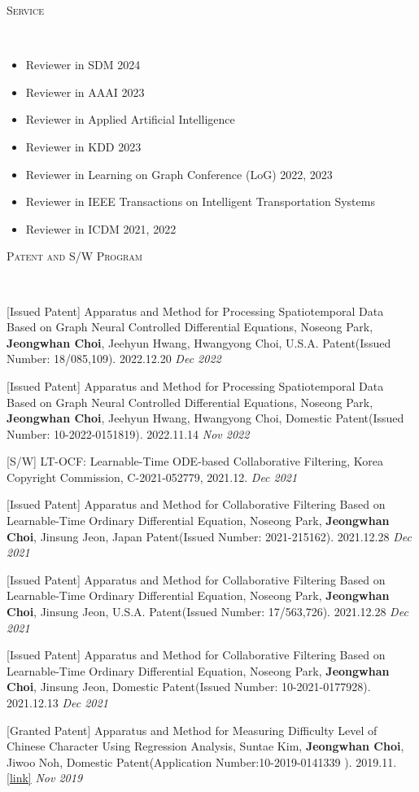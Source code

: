 \documentclass[10pt]{article}
\newenvironment{changemargin}[2]{
  \begin{list}{}{
    \setlength{\topsep}{0pt}
    \setlength{\leftmargin}{#1}
    \setlength{\rightmargin}{#2}
    \setlength{\listparindent}{\parindent}
    \setlength{\itemindent}{\parindent}
    \setlength{\parsep}{\parskip}
  }
  \item[]}{\end{list}
}
\newcommand{\lineover}{
	\begin{changemargin}{-0.05in}{-0.05in}
		\vspace*{-8pt}
		\hrulefill \\
		\vspace*{-2pt}
	\end{changemargin}
}
\newcommand{\header}[1]{
	\begin{changemargin}{-0.5in}{-0.5in}
		\scshape{#1}\\
  	\lineover
	\end{changemargin}
}
\newcommand{\presentation}[2]{
	{#1} \hfill \emph{#2}\\ \bigskip
}
\newenvironment{body} {
	\vspace*{-16pt}
	\begin{changemargin}{-0.25in}{-0.5in}
  }
	{\end{changemargin}
}
\begin{document}
\medskip

\header{Service}

\begin{body}
	\vspace{14pt}
    \begin{itemize}
        \item Reviewer in SDM 2024
        \item Reviewer in AAAI 2023
        \item Reviewer in Applied Artificial Intelligence 
        \item Reviewer in KDD 2023
        \item Reviewer in Learning on Graph Conference (LoG) 2022, 2023
        \item Reviewer in IEEE Transactions on Intelligent Transportation Systems
        \item Reviewer in ICDM 2021, 2022
    \end{itemize}
\end{body}

\medskip

\pagebreak
\header{Patent and S/W Program}

\begin{body}
	\vspace{14pt}
	
\presentation{[Issued Patent] Apparatus and Method for Processing Spatiotemporal Data Based on Graph Neural Controlled Differential Equations, Noseong Park, \textbf{Jeongwhan Choi}, Jeehyun Hwang, Hwangyong Choi, U.S.A. Patent(Issued Number: 18/085,109). 2022.12.20}{Dec 2022}	
\presentation{[Issued Patent] Apparatus and Method for Processing Spatiotemporal Data Based on Graph Neural Controlled Differential Equations, Noseong Park, \textbf{Jeongwhan Choi}, Jeehyun Hwang, Hwangyong Choi, Domestic Patent(Issued Number: 10-2022-0151819). 2022.11.14}{Nov 2022}	
\presentation{[S/W] LT-OCF: Learnable-Time ODE-based Collaborative Filtering, Korea Copyright Commission, C-2021-052779, 2021.12.}{Dec 2021}	
\presentation{[Issued Patent] Apparatus and Method for Collaborative Filtering Based on Learnable-Time Ordinary Differential Equation, Noseong Park, \textbf{Jeongwhan Choi}, Jinsung Jeon, Japan Patent(Issued Number: 2021-215162). 2021.12.28}{Dec 2021}	
\presentation{[Issued Patent] Apparatus and Method for Collaborative Filtering Based on Learnable-Time Ordinary Differential Equation, Noseong Park, \textbf{Jeongwhan Choi}, Jinsung Jeon, U.S.A. Patent(Issued Number: 	17/563,726). 2021.12.28}{Dec 2021}	
\presentation{[Issued Patent] Apparatus and Method for Collaborative Filtering Based on Learnable-Time Ordinary Differential Equation, Noseong Park, \textbf{Jeongwhan Choi}, Jinsung Jeon, Domestic Patent(Issued Number: 10-2021-0177928). 2021.12.13}{Dec 2021}	
\presentation{[Granted Patent] Apparatus and Method for Measuring Difficulty Level of Chinese Character Using Regression Analysis, Suntae Kim, \textbf{Jeongwhan Choi}, Jiwoo Noh, Domestic Patent(Application Number:10-2019-0141339 ). 2019.11. \href{https://doi.org/10.8080/1020190141339}{[link]}}{Nov 2019}	
  
\end{body}
    
\end{document}
